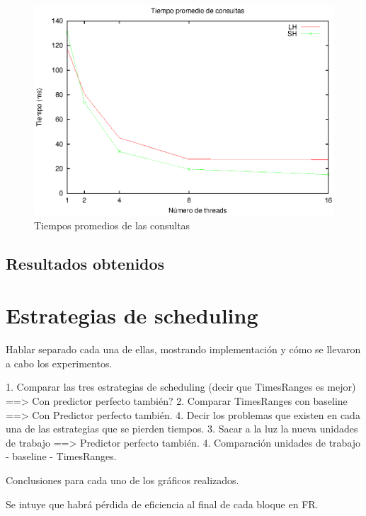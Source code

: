 \begin{figure}[!ht]
\centering
\includegraphics[scale=.75]{images/tiempos_wand.eps}
\caption{Tiempos promedios de las consultas}
\label{fig:tiempos_wand}
\end{figure}

\subsection{Resultados obtenidos}
\label{evaluacionexperimental:resultadosObtenidos}




\section{Estrategias de scheduling}
\label{evaluacionexperimental:estrategiasscheduling}

Hablar separado cada una de ellas, mostrando implementación y cómo se llevaron a cabo los experimentos.

1. Comparar las tres estrategias de scheduling (decir que TimesRanges es mejor) ==> Con predictor perfecto también?
2. Comparar TimesRanges con baseline ==> Con Predictor perfecto también.  
4. Decir los problemas que existen en cada una de las estrategias que se pierden tiempos.
3. Sacar a la luz la nueva unidades de trabajo ==> Predictor perfecto también.
4. Comparación unidades de trabajo - baseline - TimesRanges.

Conclusiones para cada uno de los gráficos realizados. 

Se intuye que habrá pérdida de eficiencia al final de cada bloque en FR.
